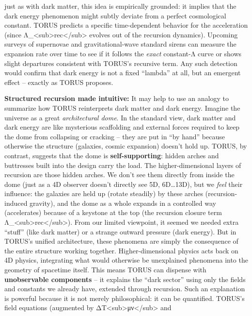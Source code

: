 \documentclass[]{article}
\begin{document}
just as with dark matter, this idea is empirically grounded: it implies
that the dark energy phenomenon might subtly deviate from a perfect
cosmological constant. TORUS predicts a specific time-dependent behavior
for the acceleration (since
Λ\_\textless{}sub\textgreater{}rec\textless{}/sub\textgreater{} evolves
out of the recursion dynamics)​. Upcoming surveys of supernovae and
gravitational-wave standard sirens can measure the expansion rate over
time to see if it follows the \emph{exact} constant-Λ curve or shows
slight departures consistent with TORUS's recursive term​. Any such
detection would confirm that dark energy is not a fixed ``lambda'' at
all, but an emergent effect -- exactly as TORUS proposes.

\textbf{Structured recursion made intuitive:} It may help to use an
analogy to summarize how TORUS reinterprets dark matter and dark energy.
Imagine the universe as a great \emph{architectural dome}. In the
standard view, dark matter and dark energy are like mysterious
scaffolding and external forces required to keep the dome from
collapsing or cracking -- they are put in ``by hand'' because otherwise
the structure (galaxies, cosmic expansion) doesn't hold up. TORUS, by
contrast, suggests that the dome is \textbf{self-supporting}: hidden
arches and buttresses built into the design carry the load. The
higher-dimensional layers of recursion are those hidden arches. We don't
see them directly from inside the dome (just as a 4D observer doesn't
directly see 5D, 6D\ldots{}13D), but we \emph{feel} their influence: the
galaxies are held up (rotate steadily) by these arches
(recursion-induced gravity), and the dome as a whole expands in a
controlled way (accelerates) because of a keystone at the top (the
recursion closure term
Λ\_\textless{}sub\textgreater{}rec\textless{}/sub\textgreater{}). From
our limited viewpoint, it seemed we needed extra ``stuff'' (like dark
matter) or a strange outward pressure (dark energy). But in TORUS's
unified architecture, these phenomena are simply the consequence of the
entire structure working together. Higher-dimensional physics acts back
on 4D physics, integrating what would otherwise be unexplained phenomena
into the geometry of spacetime itself​. This means TORUS can dispense
with \textbf{unobservable components} -- it explains the ``dark sector''
using only the fields and constants we already have, extended through
recursion. Such an explanation is powerful because it is not merely
philosophical: it can be quantified. TORUS's field equations (augmented
by ΔT\textless{}sub\textgreater{}μν\textless{}/sub\textgreater{} and
\end{document}

